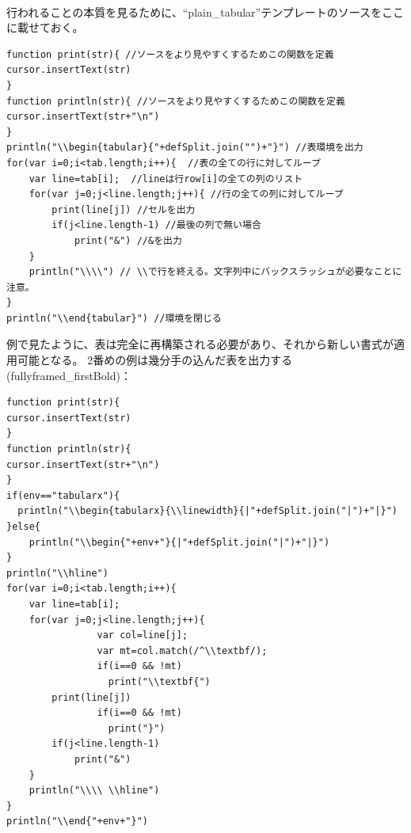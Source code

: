 \documentclass[]{book}
\begin{document}
\\

行われることの本質を見るために、``plain\_tabular''テンプレートのソースをここに載せておく。

\begin{lstlisting}
function print(str){ //ソースをより見やすくするためこの関数を定義
cursor.insertText(str)
}
function println(str){ //ソースをより見やすくするためこの関数を定義
cursor.insertText(str+"\n")
}
println("\\begin{tabular}{"+defSplit.join("")+"}") //表環境を出力
for(var i=0;i<tab.length;i++){  //表の全ての行に対してループ
    var line=tab[i];  //lineは行row[i]の全ての列のリスト
    for(var j=0;j<line.length;j++){ //行の全ての列に対してループ
        print(line[j]) //セルを出力
        if(j<line.length-1) //最後の列で無い場合
            print("&") //&を出力
    }
    println("\\\\") // \\で行を終える。文字列中にバックスラッシュが必要なことに注意。
}
println("\\end{tabular}") //環境を閉じる
\end{lstlisting}

例で見たように、表は完全に再構築される必要があり、それから新しい書式が適用可能となる。
2番めの例は幾分手の込んだ表を出力する(fullyframed\_firstBold)：

\begin{lstlisting}
function print(str){
cursor.insertText(str)
}
function println(str){
cursor.insertText(str+"\n")
}
if(env=="tabularx"){
  println("\\begin{tabularx}{\\linewidth}{|"+defSplit.join("|")+"|}")
}else{
    println("\\begin{"+env+"}{|"+defSplit.join("|")+"|}")
}
println("\\hline")
for(var i=0;i<tab.length;i++){
    var line=tab[i];
    for(var j=0;j<line.length;j++){
                var col=line[j];
                var mt=col.match(/^\\textbf/);
                if(i==0 && !mt)
                  print("\\textbf{")
        print(line[j])
                if(i==0 && !mt)
                  print("}")
        if(j<line.length-1)
            print("&")
    }
    println("\\\\ \\hline")
}
println("\\end{"+env+"}")
\end{lstlisting}
\end{document}
